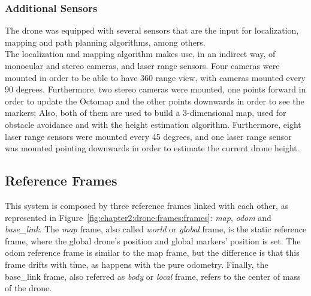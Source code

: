 \subsubsection{Additional Sensors}
The drone was equipped with several sensors that are the input for localization, mapping and path planning algorithms, among others.\\

The localization and mapping algorithm makes use, in an indirect way, of monocular and stereo cameras, and laser range sensors. Four cameras were mounted in order to be able to have 360 range view, with cameras mounted every 90 degrees. Furthermore, two stereo cameras were mounted, one points forward in order to update the Octomap and the other points downwards in order to see the markers; Also, both of them are used to build a 3-dimensional map, used for obstacle avoidance and with the height estimation algorithm. Furthermore, eight laser range sensors were mounted every 45 degrees, and one laser range sensor was mounted pointing downwards in order to estimate the current drone height.

\subsection{Reference Frames}
\label{subsec:chapter2:drone:frames}
This system is composed by three reference frames linked with each other, as represented in Figure~\ref{fig:chapter2:drone:frames:frames}: \emph{map}, \emph{odom} and \emph{base\_link}. The \emph{map} frame, also called \emph{world} or \emph{global} frame, is the static reference frame, where the global drone's position and global markers' position is set. The odom reference frame is similar to the map frame, but the difference is that this frame drifts with time, as happens with the pure odometry. Finally, the base\_link frame, also referred as \emph{body} or \emph{local} frame, refers to the center of mass of the drone.\\

